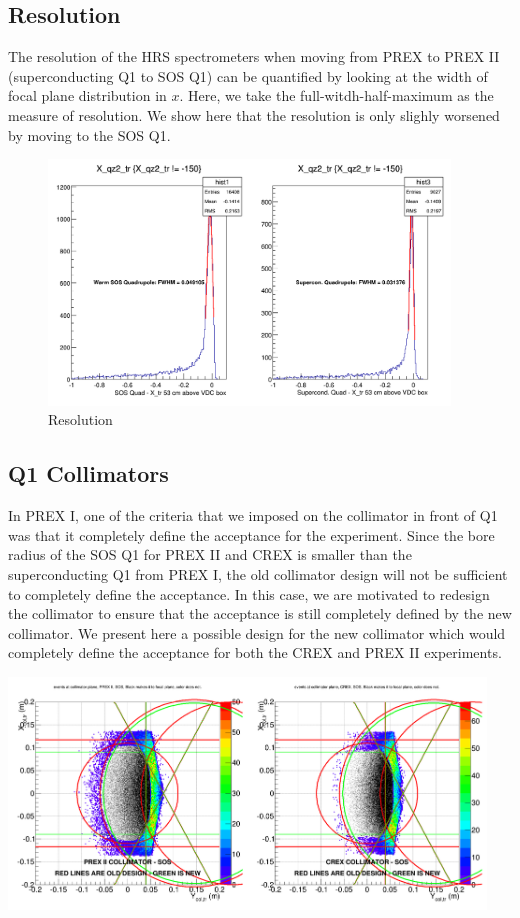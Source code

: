 \documentclass[11pt]{amsart}
\begin{document}
\subsection{ Resolution }

The resolution of the HRS spectrometers when moving from PREX to PREX II (superconducting Q1 to SOS Q1) can be quantified by looking at the width of focal plane distribution in  $x$. Here, we take the full-witdh-half-maximum as the measure of resolution. We show here that the resolution is only slighly worsened by moving to the SOS Q1.

\FloatBarrier
\begin{figure}
\includegraphics[width=0.95\textwidth]{plots/res.png}
\caption{Resolution}
\end{figure}
\FloatBarrier

\subsection{ Q1 Collimators }

In PREX I, one of the criteria that we imposed on the collimator in front of Q1 was that it completely define the acceptance for the experiment. Since the bore radius of the SOS Q1 for PREX II and CREX is smaller than the superconducting Q1 from PREX I, the old collimator design will not be sufficient to completely define the acceptance. In this case, we are motivated to redesign the collimator to ensure that the acceptance is still completely defined by the new collimator. We present here a possible design for the new collimator which would completely define the acceptance for both the CREX and PREX II experiments.

\FloatBarrier
\includegraphics[width=0.95\textwidth]{plots/newcol.png}
\FloatBarrier
\end{document}
